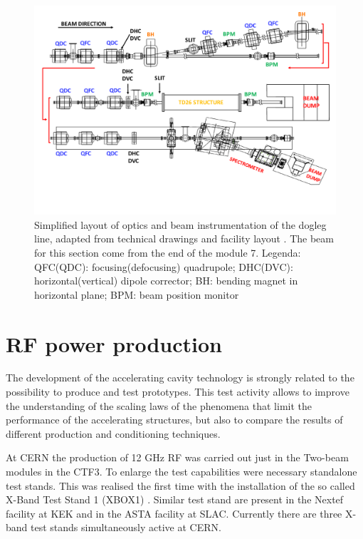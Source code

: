 \begin{landscape}
\begin{figure}
\centering 
\includegraphics[scale=0.78]{pictures/modified_pets.pdf}
\caption{Simplified layout of optics and beam instrumentation of the dogleg line, adapted from technical drawings and facility layout \cite{EDMS:CTF3}. The beam for this section come from the end of the module 7. Legenda: QFC(QDC): focusing(defocusing) quadrupole; DHC(DVC): horizontal(vertical) dipole corrector; BH: bending magnet in horizontal plane; BPM: beam position monitor}
\label{dolaut}
\end{figure}
\end{landscape}



\section[RF power production]{RF power production}

The development of the accelerating cavity technology is strongly related to the possibility to produce and test prototypes. This test activity allows to improve the understanding of the scaling laws of the phenomena that limit the performance of the accelerating structures, but also to compare the results of different production and conditioning techniques. 

At CERN the production of 12 GHz RF was carried out just in the Two-beam modules in the CTF3. To enlarge the test capabilities were necessary standalone test stands. This was realised the first time with the installation of the so called X-Band Test Stand 1 (XBOX1) \cite{Peauger:1287901}. Similar test stand are present in the Nextef facility at KEK and in the ASTA facility at SLAC. Currently there are three X-band test stands simultaneously active at CERN.

